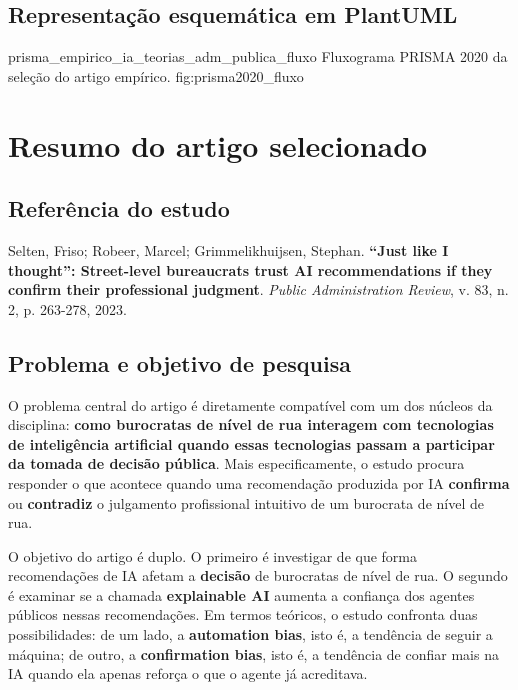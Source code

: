 \documentclass[12pt]{article}
\begin{document}
\clearpage
\clearpage
\subsection{Representação esquemática em PlantUML}
\label{sec:org2f52f52}

\FGVAutoSVG
  {prisma_empirico_ia_teorias_adm_publica_fluxo}
  {Fluxograma PRISMA 2020 da seleção do artigo empírico.}
  {fig:prisma2020_fluxo}

\section{Resumo do artigo selecionado}
\label{sec:org74649b8}

\subsection{Referência do estudo}
\label{sec:orgfe084f4}

Selten, Friso; Robeer, Marcel; Grimmelikhuijsen, Stephan. \textbf{“Just like I thought”: Street-level bureaucrats trust AI recommendations if they confirm their professional judgment}. \emph{Public Administration Review}, v. 83, n. 2, p. 263-278, 2023.

\subsection{Problema e objetivo de pesquisa}
\label{sec:orgdb1b6df}

O problema central do artigo é diretamente compatível com um dos núcleos da disciplina: \textbf{como burocratas de nível de rua interagem com tecnologias de inteligência artificial quando essas tecnologias passam a participar da tomada de decisão pública}. Mais especificamente, o estudo procura responder o que acontece quando uma recomendação produzida por IA \textbf{confirma} ou \textbf{contradiz} o julgamento profissional intuitivo de um burocrata de nível de rua.

O objetivo do artigo é duplo. O primeiro é investigar de que forma recomendações de IA afetam a \textbf{decisão} de burocratas de nível de rua. O segundo é examinar se a chamada \textbf{explainable AI} aumenta a confiança dos agentes públicos nessas recomendações. Em termos teóricos, o estudo confronta duas possibilidades: de um lado, a \textbf{automation bias}, isto é, a tendência de seguir a máquina; de outro, a \textbf{confirmation bias}, isto é, a tendência de confiar mais na IA quando ela apenas reforça o que o agente já acreditava.
\end{document}

